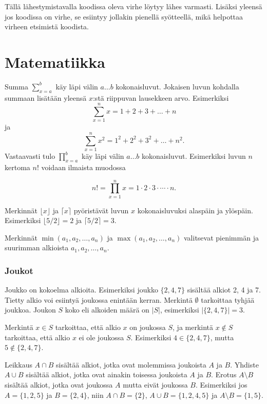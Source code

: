 Tällä lähestymistavalla
koodissa oleva virhe löytyy
lähes varmasti.
Lisäksi yleensä jos koodissa on virhe,
se esiintyy jollakin pienellä syötteellä,
mikä helpottaa virheen etsimistä koodista.

\section{Matematiikka}

Summa $\sum_{x=a}^b$ käy läpi välin $a \ldots b$ kokonaisluvut.
Jokaisen luvun kohdalla summaan lisätään
yleensä $x$:stä riippuvan lausekkeen arvo.
Esimerkiksi
\[\sum_{x=1}^n x = 1+2+3+\ldots+n\]
ja
\[\sum_{x=1}^n x^2 = 1^2+2^2+3^2+\ldots+n^2.\]
Vastaavasti tulo $\prod_{x=a}^b$
käy läpi välin $a \ldots b$ kokonaisluvut.
Esimerkiksi luvun $n$ kertoma $n!$ voidaan ilmaista muodossa

\[n! = \prod_{x=1}^n x = 1 \cdot 2 \cdot 3 \cdot \cdots \cdot n.\]

Merkinnät $\lfloor x \rfloor$ ja $\lceil x \rceil$
pyöristävät luvun $x$ kokonaisluvuksi alaspäin ja ylöspäin.
Esimerkiksi $\lfloor 5/2 \rfloor = 2$ ja $\lceil 5/2 \rceil = 3$.

Merkinnät $\min(a_1,a_2,\ldots,a_n)$ ja
$\max(a_1,a_2,\ldots,a_n)$ valitsevat
pienimmän ja suurimman alkioista
$a_1,a_2,\ldots,a_n$.

\subsubsection{Joukot}


Joukko on kokoelma alkioita.
Esimerkiksi joukko $\{2,4,7\}$
sisältää alkiot 2, 4 ja 7.
Tietty alkio voi esiintyä joukossa enintään kerran.
Merkintä $\emptyset$ tarkoittaa tyhjää joukkoa.
Joukon $S$ koko eli alkoiden määrä on $|S|$,
esimerkiksi $|\{2,4,7\}|=3$.

Merkintä $x \in S$ tarkoittaa,
että alkio $x$ on joukossa $S$,
ja merkintä $x \notin S$ tarkoittaa,
että alkio $x$ ei ole joukossa $S$.
Esimerkiksi $4 \in \{2,4,7\}$,
mutta $5 \notin \{2,4,7\}$.

Leikkaus $A \cap B$ sisältää alkiot,
jotka ovat molemmissa joukoista $A$ ja $B$.
Yhdiste $A \cup B$ sisältää alkiot,
jotka ovat ainakin toisessa joukoista $A$ ja $B$.
Erotus $A \setminus B$ sisältää alkiot,
jotka ovat joukossa $A$ mutta eivät joukossa $B$.
Esimerkiksi jos $A=\{1,2,5\}$ ja $B=\{2,4\}$,
niin $A \cap B = \{2\}$, $A \cup B = \{1,2,4,5\}$
ja $A \setminus B = \{1,5\}$.

